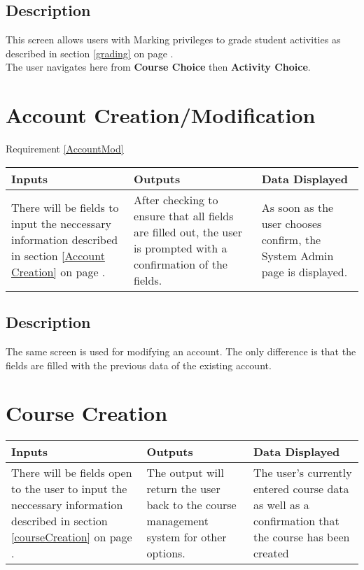 \documentclass{article}
\begin{document}
\subsection{Description}
This screen allows users with Marking privileges to grade student activities
as described in section \ref{grading} on page \pageref{grading}.\\
The user navigates here from \textbf{Course Choice} then \textbf{Activity Choice}.

\section{Account Creation/Modification}
Requirement \ref{AccountMod}
\begin{tabular}{| p{5cm} | p{5cm} | p{5cm} |}
	\hline
	Inputs & Outputs & Data Displayed \\ \hline
	There will be fields to input the neccessary information described
in section \ref{Account Creation} on page \pageref{Account Creation}.
	& After checking to ensure that all fields are filled out, the user is 
	prompted with a confirmation of the fields. 
	& As soon as the user chooses confirm, the System Admin page is displayed.
	
	\\ \hline
\end{tabular}

\subsection{Description}
The same screen is used for modifying an account. The only difference is
that the fields are filled with the previous data of the existing account.

\section{Course Creation}
\begin{tabular}{| p{5cm} | p{5cm} | p{5cm} |}
	\hline
	Inputs & Outputs & Data Displayed \\ \hline
	There will be fields open to the user to input the neccessary information described
in section \ref{courseCreation} on page \pageref{courseCreation}.
	& The output will return
the user back to the course management system for other options.
	& The user's currently entered course data as well as a confirmation that the course
	has been created
	\\ \hline
\end{tabular}
\end{document}

